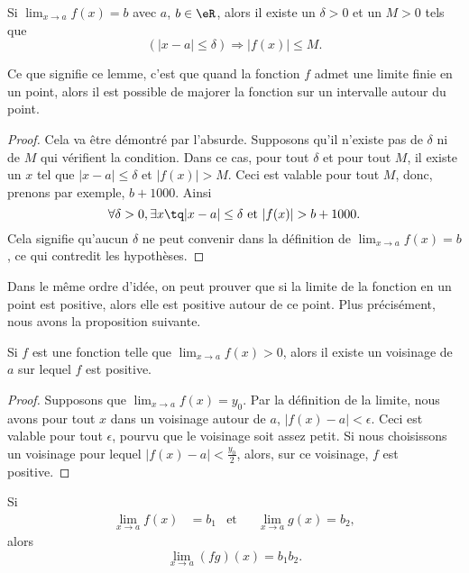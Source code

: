 \begin{lemma}       \label{LemLimMajorableVois}
	Si \( \lim_{x\to a}f(x)=b\) avec \( a\), \( b\in\eR\), alors il existe un \( \delta>0\) et un \( M>0\) tels que
	\[
		(| x-a |\leq\delta)\Rightarrow | f(x) |\leq M.
	\]
\end{lemma}

Ce que signifie ce lemme, c'est que quand la fonction \( f\) admet une limite finie en un point, alors il est possible de majorer la fonction sur un intervalle autour du point.

\begin{proof}
	Cela va être démontré par l'absurde. Supposons qu'il n'existe pas de \( \delta\) ni de \( M\) qui vérifient la condition. Dans ce cas, pour tout \( \delta\) et pour tout \( M\), il existe un \( x\) tel que \( | x-a |\leq\delta\) et \( | f(x) |> M\). Ceci est valable pour tout \( M\), donc, prenons par exemple, \( b+1000\). Ainsi
	\begin{equation}
		\forall\delta>0,\exists x \tq | x-a |\leq\delta\text{ et }| f(x) |>b+1000.
	\end{equation}
	Cela signifie qu'aucun \( \delta\) ne peut convenir dans la définition de \( \lim_{x\to a}f(x)=b\), ce qui contredit les hypothèses.
\end{proof}

Dans le même ordre d'idée, on peut prouver que si la limite de la fonction en un point est positive, alors elle est positive autour de ce point. Plus précisément, nous avons la proposition suivante.

\begin{proposition} \label{PropoLimPosFPos}
	Si \( f\) est une fonction telle que \( \lim_{x\to a}f(x)>0\), alors il existe un voisinage de \( a\) sur lequel \( f\) est positive.
\end{proposition}

\begin{proof}
	Supposons que \( \lim_{x\to a}f(x)=y_0\). Par la définition de la limite, nous avons pour tout \( x\) dans un voisinage autour de \( a\), \( | f(x)-a |<\epsilon\). Ceci est valable pour tout \( \epsilon\), pourvu que le voisinage soit assez petit. Si nous choisissons un voisinage pour lequel \( | f(x)-a |<\frac{ y_0 }{ 2 }\), alors, sur ce voisinage, \( f\) est positive.
\end{proof}

\begin{theorem}     \label{Tholimfgabab}
	Si
	\begin{align}
		\lim_{x\to a}f(x) & =b_1 & \text{et} &  & \lim_{x\to a}g(x)=b_2,
	\end{align}
	alors
	\begin{equation}
		\lim_{x\to a}(fg)(x)=b_1b_2.
	\end{equation}
\end{theorem}

